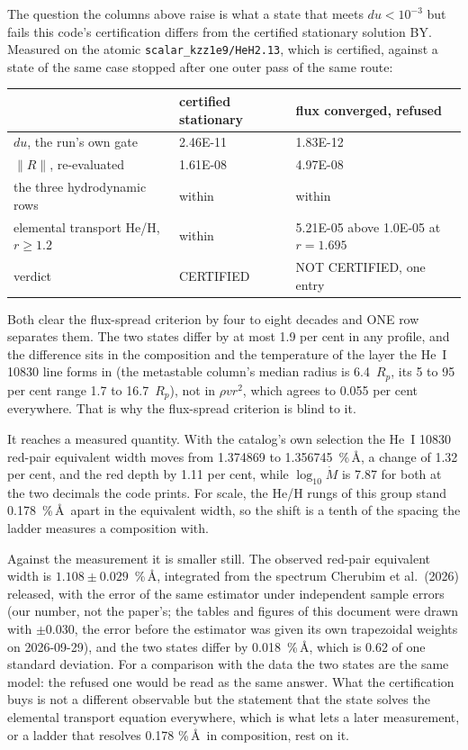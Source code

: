 \documentclass[11pt]{my_memo}
\begin{document}
The question the columns above raise is what a state that meets $du < 10^{-3}$
but fails this code's certification differs from the certified stationary
solution BY. Measured on the atomic \texttt{scalar\_kzz1e9/HeH2.13}, which is certified,
against a state of the same case stopped after one outer pass of the same
route:

\begin{center}
\footnotesize
\begin{tabular}{@{}l l l@{}}
\toprule
 & certified stationary & flux converged, refused\\
\midrule
$du$, the run's own gate & 2.46E-11 & 1.83E-12\\
$\lVert R\rVert$, re-evaluated & 1.61E-08 & 4.97E-08\\
the three hydrodynamic rows & within & within\\
elemental transport He/H, $r \ge 1.2$ & within & 5.21E-05 above 1.0E-05 at $r = 1.695$\\
verdict & CERTIFIED & NOT CERTIFIED, one entry\\
\bottomrule
\end{tabular}
\end{center}

\noindent
Both clear the flux-spread criterion by four to eight decades and ONE row
separates them. The two states differ by at most 1.9 per cent in any profile,
and the difference sits in the composition and the temperature of the layer
the He~I 10830 line forms in (the metastable column's median radius is
6.4~$R_p$, its 5 to 95 per cent range 1.7 to 16.7~$R_p$), not in
$\rho v r^2$, which agrees to 0.055 per cent everywhere. That is why the
flux-spread criterion is blind to it.

It reaches a measured quantity. With the catalog's own selection the He~I
10830 red-pair equivalent width moves from 1.374869 to 1.356745~\%\,\AA, a
change of 1.32 per cent, and the red depth by 1.11 per cent, while
$\log_{10}\dot{M}$ is 7.87 for both at the two decimals the code prints. For
scale, the He/H rungs of this group stand 0.178~\%\,\AA\ apart in the
equivalent width, so the shift is a tenth of the spacing the ladder measures
a composition with.

Against the measurement it is smaller still. The observed red-pair equivalent
width is $1.108 \pm 0.029$~\%\,\AA, integrated from the spectrum Cherubim
et al.\ (2026) released, with the error of the same estimator under
independent sample errors (our number, not the paper's; the tables and figures
of this document were drawn with $\pm 0.030$, the error before the estimator
was given its own trapezoidal weights on 2026-09-29), and the two states
differ by 0.018~\%\,\AA, which is 0.62 of one standard deviation. For a comparison with the data the
two states are the same model: the refused one would be read as the same
answer. What the certification buys is not a different observable but the
statement that the state solves the elemental transport equation everywhere,
which is what lets a later measurement, or a ladder that resolves 0.178
\%\,\AA\ in composition, rest on it.
\end{document}

